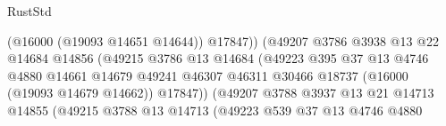 \begin{lexlean}{RustStd}
\begin{coremodule}
                                                  (@16000 (@19093 @14651 @14644))
                                                  @17847))
                                              (@49207
                                                @3786
                                                @3938
                                                @13
                                                @22
                                                @14684
                                                @14856
                                                (@49215
                                                  @3786
                                                  @13
                                                  @14684
                                                  (@49223
                                                    @395
                                                    @37
                                                    @13
                                                    @4746
                                                    @4880
                                                    @14661
                                                    @14679
                                                    @49241
                                                    @46307
                                                    @46311
                                                    @30466
                                                    @18737
                                                    (@16000 (@19093 @14679 @14662))
                                                    @17847))
                                                (@49207
                                                  @3788
                                                  @3937
                                                  @13
                                                  @21
                                                  @14713
                                                  @14855
                                                  (@49215
                                                    @3788
                                                    @13
                                                    @14713
                                                    (@49223
                                                      @539
                                                      @37
                                                      @13
                                                      @4746
                                                      @4880

\end{coremodule}
\end{lexlean}
